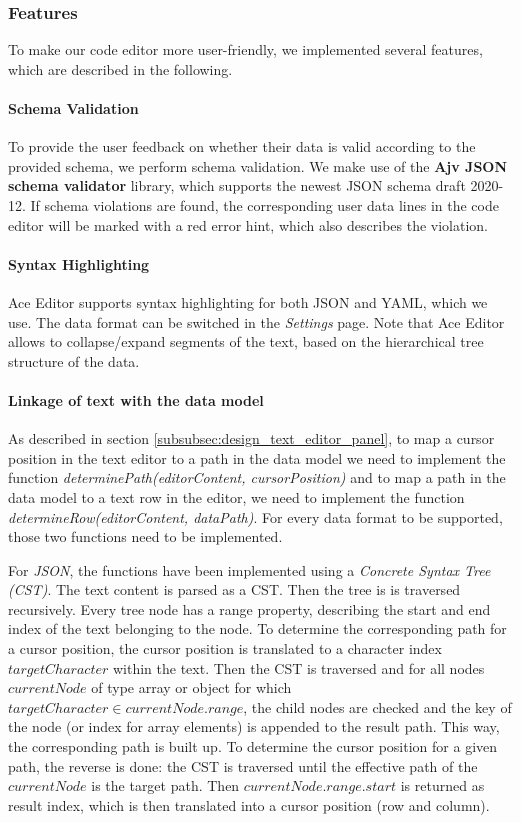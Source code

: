 \subsubsection{Features}

To make our code editor more user-friendly, we implemented several features, which are described in the following.

\paragraph{Schema Validation}
To provide the user feedback on whether their data is valid according to the provided schema, we perform schema validation.
We make use of the \textbf{Ajv JSON schema validator}\cite{ajv-validator} library, which supports the newest JSON schema draft 2020-12.
If schema violations are found, the corresponding user data lines in the code editor will be marked with a red error hint, which also describes the violation.


\paragraph{Syntax Highlighting}
Ace Editor supports syntax highlighting for both JSON and YAML, which we use.
The data format can be switched in the \textit{Settings} page.
Note that Ace Editor allows to collapse/expand segments of the text, based on the hierarchical tree structure of the data.

\paragraph{Linkage of text with the data model}
As described in section \ref{subsubsec:design_text_editor_panel}, to map a cursor position in the text editor to a path in the data model we need to implement the function \textit{determinePath(editorContent, cursorPosition)} and to map a path in the data model to a text row in the editor, we need to implement the function \textit{determineRow(editorContent, dataPath)}. For every data format to be supported, those two functions need to be implemented.

For \textit{JSON}, the functions have been implemented using a \textit{Concrete Syntax Tree (CST)}.
The text content is parsed as a CST. Then the tree is is traversed recursively.
Every tree node has a range property, describing the start and end index of the text belonging to the node.
To determine the corresponding path for a cursor position, the cursor position is translated to a character index $targetCharacter$ within the text.
Then the CST is traversed and for all nodes $currentNode$ of type array or object for which $targetCharacter \in currentNode.range$,
the child nodes are checked and the key of the node (or index for array elements) is appended to the result path.
This way, the corresponding path is built up.
To determine the cursor position for a given path, the reverse is done: the CST is traversed until the effective path of the $currentNode$ is the target path. Then $currentNode.range.start$ is returned as result index, which is then translated into a cursor position (row and column).

